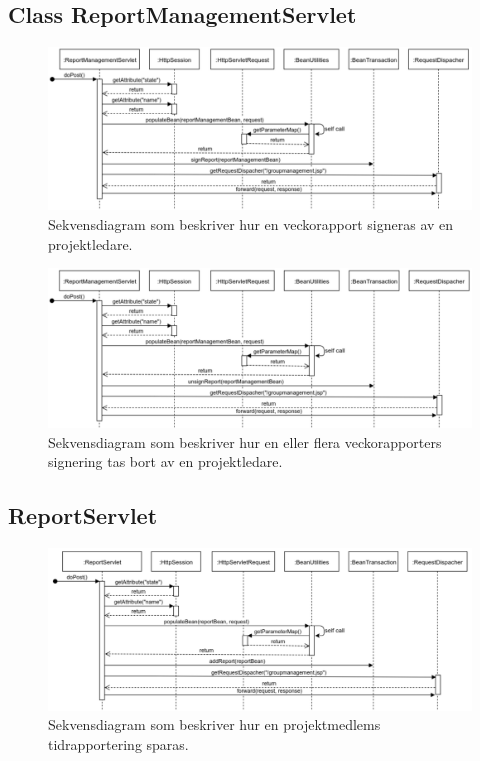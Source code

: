 \documentclass[paper=a4, fontsize=11pt,twoside]{article}
\begin{document}
\subsection{Class ReportManagementServlet}

\begin{figure}[H]
\centering
\includegraphics[width=175mm]{ReportManagementServlet}
\caption{Sekvensdiagram som beskriver hur en veckorapport signeras av en projektledare. }
\end{figure}

\begin{figure}[H]
\centering
\includegraphics[width=175mm]{ReportManagementServlet2}
\caption{Sekvensdiagram som beskriver hur en eller flera veckorapporters signering tas bort av en projektledare.}
\end{figure}

\subsection{ReportServlet}

\begin{figure}[H]
\centering
\includegraphics[width=175mm]{ReportServlet}
\caption{Sekvensdiagram som beskriver hur en projektmedlems tidrapportering sparas.}
\end{figure}
\end{document}
